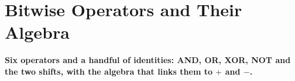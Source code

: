 \chapter{Bitwise Operators and Their Algebra}
\label{ch:operators}

\begin{tcolorbox}[enhanced, colback=white, colframe=secondaryblue, boxrule=1pt, arc=2mm]
\textbf{\large\textcolor{primaryblue}{Six operators and a handful of identities: AND, OR, XOR, NOT and the two shifts, with the algebra that links them to $+$ and $-$.}}
\end{tcolorbox}


